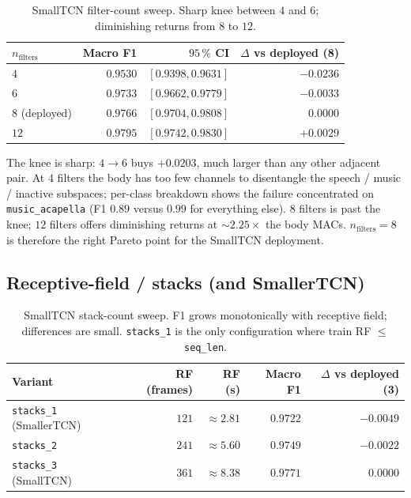\begin{table}[h]
\centering
\begin{tabular}{lrrr}
\toprule
\textbf{$n_{\text{filters}}$} & \textbf{Macro F1} & \textbf{$95\,\%$ CI} & \textbf{$\Delta$ vs deployed (8)} \\
\midrule
$4$  & $0.9530$          & $[0.9398, 0.9631]$ & $-0.0236$ \\
$6$  & $0.9733$          & $[0.9662, 0.9779]$ & $-0.0033$ \\
$8$  (deployed) & $\mathbf{0.9766}$ & $[0.9704, 0.9808]$ & $\phantom{+}0.0000$ \\
$12$ & $0.9795$          & $[0.9742, 0.9830]$ & $+0.0029$ \\
\bottomrule
\end{tabular}
\caption{SmallTCN filter-count sweep. Sharp knee between $4$ and $6$; diminishing returns from $8$ to $12$.}
\label{tab:filter_pareto_results}
\end{table}

The knee is sharp: $4 \to 6$ buys $+0.0203$, much larger than any other adjacent pair.
At $4$ filters the body has too few channels to disentangle the speech / music / inactive subspaces; per-class breakdown shows the failure concentrated on \texttt{music\_acapella} (F1 $0.89$ versus $0.99$ for everything else).
$8$ filters is past the knee; $12$ filters offers diminishing returns at $\sim 2.25\times$ the body MACs.
$n_{\text{filters}} = 8$ is therefore the right Pareto point for the SmallTCN deployment.

\subsection{Receptive-field / stacks (and SmallerTCN)}
\label{subsec:exp_small_tcn_stacks}
\label{sec:exp_small_tcn_stacks}

\begin{table}[h]
\centering
\begin{tabular}{lrrrr}
\toprule
\textbf{Variant} & \textbf{RF (frames)} & \textbf{RF (s)} & \textbf{Macro F1} & \textbf{$\Delta$ vs deployed (3)} \\
\midrule
\texttt{stacks\_1} (SmallerTCN) & $121$ & $\approx 2.81$ & $0.9722$  & $-0.0049$ \\
\texttt{stacks\_2}              & $241$ & $\approx 5.60$ & $0.9749$  & $-0.0022$ \\
\texttt{stacks\_3} (SmallTCN)   & $361$ & $\approx 8.38$ & $\mathbf{0.9771}$ & $\phantom{+}0.0000$ \\
\bottomrule
\end{tabular}
\caption{SmallTCN stack-count sweep. F1 grows monotonically with receptive field; differences are small. \texttt{stacks\_1} is the only configuration where train RF $\le$ \texttt{seq\_len}.}
\label{tab:stacks_results}
\end{table}


